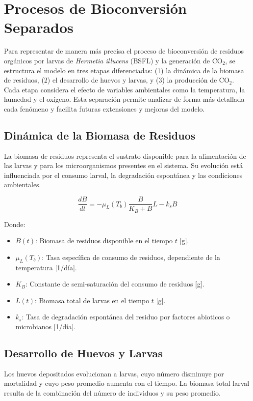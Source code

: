 \section{Procesos de Bioconversi\'on Separados}

Para representar de manera m\'as precisa el proceso de bioconversi\'on de residuos org\'anicos por larvas de \textit{Hermetia illucens} (BSFL) y la generaci\'on de CO$_2$, se estructura el modelo en tres etapas diferenciadas: (1) la din\'amica de la biomasa de residuos, (2) el desarrollo de huevos y larvas, y (3) la producci\'on de CO$_2$. Cada etapa considera el efecto de variables ambientales como la temperatura, la humedad y el ox\'igeno. Esta separaci\'on permite analizar de forma m\'as detallada cada fen\'omeno y facilita futuras extensiones y mejoras del modelo.

\subsection{Din\'amica de la Biomasa de Residuos}
La biomasa de residuos representa el sustrato disponible para la alimentaci\'on de las larvas y para los microorganismos presentes en el sistema. Su evoluci\'on est\'a influenciada por el consumo larval, la degradaci\'on espont\'anea y las condiciones ambientales.

\begin{equation}
\frac{dB}{dt} = -\mu_L(T_b) \frac{B}{K_B + B} L - k_s B
\end{equation}

Donde:
\begin{itemize}
    \item $B(t)$: Biomasa de residuos disponible en el tiempo $t$ [g].
    \item $\mu_L(T_b)$: Tasa espec\'ifica de consumo de residuos, dependiente de la temperatura [1/d\'ia].
    \item $K_B$: Constante de semi-saturaci\'on del consumo de residuos [g].
    \item $L(t)$: Biomasa total de larvas en el tiempo $t$ [g].
    \item $k_s$: Tasa de degradaci\'on espont\'anea del residuo por factores abioticos o microbianos [1/d\'ia].
\end{itemize}

\subsection{Desarrollo de Huevos y Larvas}
Los huevos depositados evolucionan a larvas, cuyo n\'umero disminuye por mortalidad y cuyo peso promedio aumenta con el tiempo. La biomasa total larval resulta de la combinaci\'on del n\'umero de individuos y su peso promedio.

